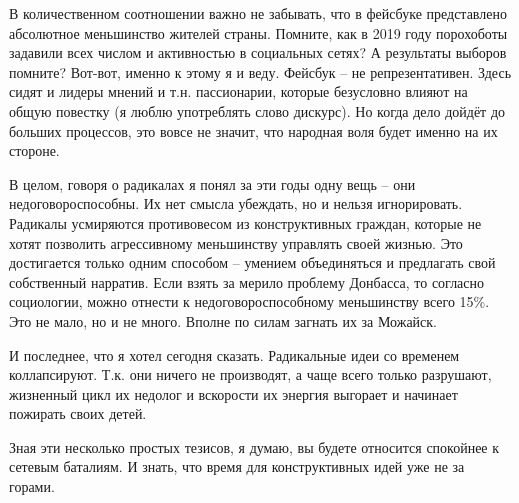 В количественном соотношении важно не забывать, что в фейсбуке представлено
абсолютное меньшинство жителей страны. Помните, как в 2019 году порохоботы
задавили всех числом и активностью в социальных сетях? А результаты выборов
помните? Вот-вот, именно к этому я и веду. Фейсбук – не репрезентативен. Здесь
сидят и лидеры мнений и т.н. пассионарии, которые безусловно влияют на общую
повестку (я люблю употреблять слово дискурс). Но когда дело дойдёт до больших
процессов, это вовсе не значит, что народная воля будет именно на их стороне.

В целом, говоря о радикалах я понял за эти годы одну вещь – они
недоговороспособны. Их нет смысла убеждать, но и нельзя игнорировать. Радикалы
усмиряются противовесом из конструктивных граждан, которые не хотят позволить
агрессивному меньшинству управлять своей жизнью. Это достигается только одним
способом – умением объединяться и предлагать свой собственный нарратив. Если
взять за мерило проблему Донбасса, то согласно социологии, можно отнести к
недоговороспособному меньшинству всего 15\%. Это не мало, но и не много. Вполне
по силам загнать их за Можайск.

И последнее, что я хотел сегодня сказать. Радикальные идеи со временем
коллапсируют. Т.к. они ничего не производят, а чаще всего только разрушают,
жизненный цикл их недолог и вскорости их энергия выгорает и начинает пожирать
своих детей.

Зная эти несколько простых тезисов, я думаю, вы будете относится спокойнее к
сетевым баталиям. И знать, что время для конструктивных идей уже не за горами.

